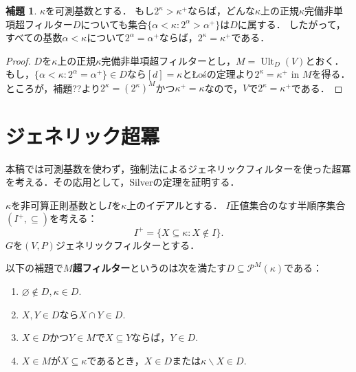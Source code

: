\documentclass[uplatex]{jsarticle}
\newcommand{\Pow}{\mathcal{P}}
\newcommand{\Ult}{\operatorname{Ult}}
\renewcommand\emptyset{\varnothing}
\renewcommand\subset{\subseteq}
\renewcommand{\setminus}{\smallsetminus}
\theoremstyle{definition}
\newtheorem{lem}[thm]{補題}
\begin{document}
	\begin{lem}
		$\kappa$を可測基数とする．
		もし$2^\kappa > \kappa^+$ならば，どんな$\kappa$上の正規$\kappa$完備非単項超フィルター$D$についても集合$\{ \alpha < \kappa : 2^\alpha > \alpha^+ \}$は$D$に属する．
		したがって，すべての基数$\alpha < \kappa$について$2^\alpha = \alpha^+$ならば，$2^\kappa = \kappa^+$である．
	\end{lem}
	\begin{proof}
		$D$を$\kappa$上の正規$\kappa$完備非単項超フィルターとし，$M = \Ult_D(V)$とおく．
		もし，$\{ \alpha < \kappa : 2^\alpha = \alpha^+ \} \in D$なら$[d] = \kappa$とŁośの定理より$2^\kappa = \kappa^+$ in $M$を得る．
		ところが，補題??より$2^\kappa = (2^\kappa)^M$かつ$\kappa^+ = \kappa$なので，$V$で$2^\kappa = \kappa^+$である．
	\end{proof}
	
	\section{ジェネリック超冪}
	
	本稿では可測基数を使わず，強制法によるジェネリックフィルターを使った超冪を考える．その応用として，Silverの定理を証明する．
	
	$\kappa$を非可算正則基数とし$I$を$\kappa$上のイデアルとする．
	$I$正値集合のなす半順序集合$(I^+, \subset)$を考える：
	\[
	I^+ = \{ X \subset \kappa : X \not \in I \}.
	\]
	$G$を$(V, P)$ジェネリックフィルターとする．
	
	以下の補題で\textbf{$M$超フィルター}というのは次を満たす$D \subset \Pow^M(\kappa)$である：
	\begin{enumerate}
		\item $\emptyset \not \in D, \kappa \in D$.
		\item $X, Y \in D$なら$X \cap Y \in D$.
		\item $X \in D$かつ$Y \in M$で$X \subset Y$ならば，$Y \in D$.
		\item $X \in M$が$X \subset \kappa$であるとき，$X \in D$または$\kappa \setminus X \in D$.
	\end{enumerate}
	
\end{document}
